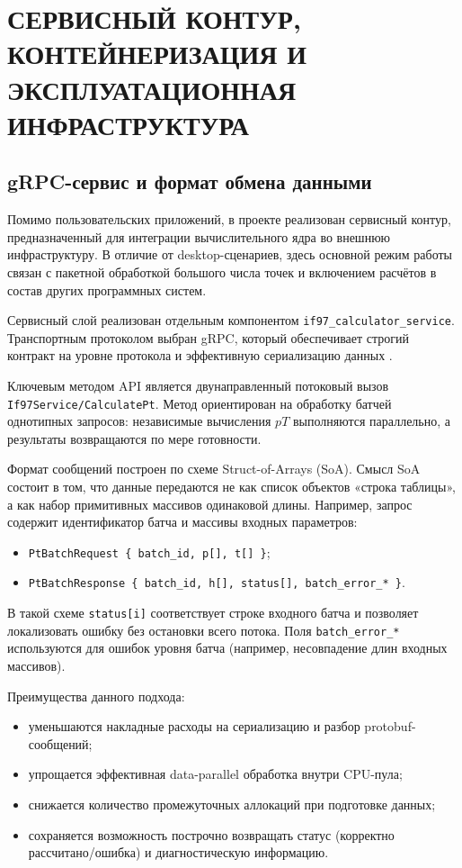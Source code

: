 \chapter{СЕРВИСНЫЙ КОНТУР, КОНТЕЙНЕРИЗАЦИЯ И ЭКСПЛУАТАЦИОННАЯ ИНФРАСТРУКТУРА}

\section{gRPC-сервис и формат обмена данными}

Помимо пользовательских приложений, в проекте реализован сервисный контур, предназначенный для интеграции вычислительного ядра во внешнюю инфраструктуру.  
В отличие от desktop-сценариев, здесь основной режим работы связан с пакетной обработкой большого числа точек и включением расчётов в состав других программных систем.  

Сервисный слой реализован отдельным компонентом \texttt{if97\_calculator\_service}.  
Транспортным протоколом выбран gRPC, который обеспечивает строгий контракт на уровне протокола и эффективную сериализацию данных \cite{grpc_docs}.  

Ключевым методом API является двунаправленный потоковый вызов \texttt{If97Service/CalculatePt}.  
Метод ориентирован на обработку батчей однотипных запросов:
независимые вычисления $pT$ выполняются параллельно,
а результаты возвращаются по мере готовности.  

Формат сообщений построен по схеме Struct-of-Arrays (SoA).  
Смысл SoA состоит в том, что данные передаются не как список объектов «строка таблицы», а как набор примитивных массивов одинаковой длины.  
Например, запрос содержит идентификатор батча и массивы входных параметров:
\begin{itemize}
\item \texttt{PtBatchRequest \{ batch\_id, p[], t[] \}};  
\item \texttt{PtBatchResponse \{ batch\_id, h[], status[], batch\_error\_* \}}.  
\end{itemize}

В такой схеме \texttt{status[i]} соответствует строке входного батча
и позволяет локализовать ошибку без остановки всего потока.
Поля \texttt{batch\_error\_*} используются для ошибок уровня батча
(например, несовпадение длин входных массивов).

Преимущества данного подхода:
\begin{itemize}
\item уменьшаются накладные расходы на сериализацию и разбор protobuf-сообщений;  
\item упрощается эффективная data-parallel обработка внутри CPU-пула;  
\item снижается количество промежуточных аллокаций при подготовке данных;  
\item сохраняется возможность построчно возвращать статус (корректно рассчитано/ошибка) и диагностическую информацию.  
\end{itemize}

